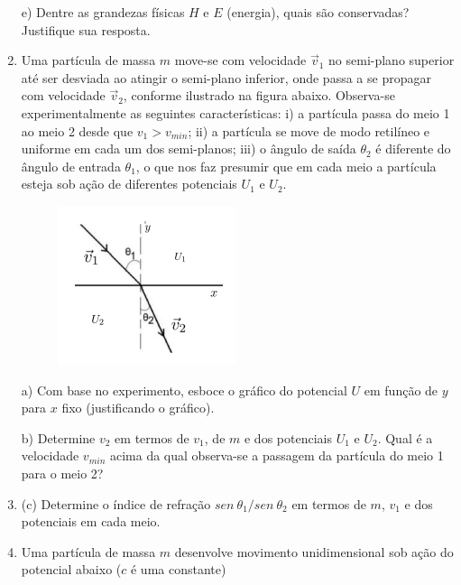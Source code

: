 \begin{enumerate}[start=1,label={\bfseries Q\arabic*.}]
\resposta

e) Dentre as grandezas físicas $H$ e $E$ (energia), quais são conservadas? Justifique sua resposta.

\resposta





\item Uma partícula de massa $m$ move-se com velocidade $\vec{v}_{1}$ no semi-plano superior até ser desviada ao atingir o semi-plano inferior, onde passa a se propagar com velocidade $\vec{v}_{2}$, conforme ilustrado na figura abaixo. Observa-se experimentalmente as seguintes características: i) a partícula passa do meio 1 ao meio 2 desde que $v_{1} > v_{min}$; ii) a partícula se move de modo retilíneo e uniforme em cada um dos semi-planos; iii) o ângulo de saída $\theta_{2}$ é diferente do ângulo de entrada $\theta_{1}$, o que nos faz presumir que em cada meio a partícula esteja sob ação de diferentes
potenciais $U_{1}$ e $U_{2}$.

\begin{figure}[H]
\centering
\includegraphics[scale=0.8]{classica-img/refracao.png}
\end{figure}


a) Com base no experimento, esboce o gráfico do potencial $U$ em função de $y$ para $x$ fixo (justificando o gráfico).

\resposta

b) Determine $v_{2}$ em termos de $v_{1}$, de $m$ e dos potenciais $U_{1}$ e $U_{2}$. Qual é a velocidade $v_{min}$ acima da qual observa-se a passagem da partícula do meio 1 para o meio 2?
\item(c) Determine o índice de refração $sen\ \theta_{1} / sen\ \theta_{2}$ em termos de $m$, $v_{1}$ e dos potenciais em cada
meio.

\resposta


\item Uma partícula de massa $m$ desenvolve movimento unidimensional sob ação do potencial abaixo ($c$ é uma constante)


\end{enumerate}
